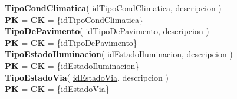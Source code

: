 \textbf{TipoCondClimatica}(
    \uline{idTipoCondClimatica},
    descripcion
)\\
\textbf{PK} = \textbf{CK} =  \{idTipoCondClimatica\}\\

\textbf{TipoDePavimento}(
    \uline{idTipoDePavimento},
    descripcion
)\\
\textbf{PK} = \textbf{CK} = \{idTipoDePavimento\}\\

\textbf{TipoEstadoIluminacion}(
    \uline{idEstadoIluminacion},
    descripcion
)\\
\textbf{PK} = \textbf{CK} = \{idEstadoIluminacion\}\\

\textbf{TipoEstadoVia}(
    \uline{idEstadoVia},
    descripcion
)\\
\textbf{PK} = \textbf{CK} = \{idEstadoVia\}\\
